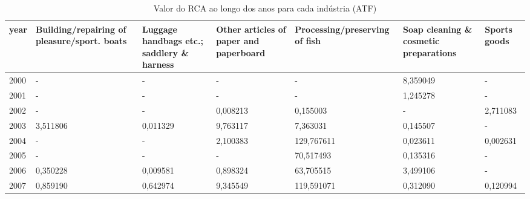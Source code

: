 \begin{table}
\centering
\caption{Valor do RCA ao longo dos anos para cada indústria (ATF)}
\begin{tabular}{p{1cm}p{2cm}p{2cm}p{2cm}p{2cm}p{2cm}p{2cm}}
\toprule
 year &  Building/repairing of pleasure/sport. boats &  Luggage handbags etc.; saddlery \& harness &  Other articles of paper and paperboard &  Processing/preserving of fish &  Soap cleaning \& cosmetic preparations &  Sports goods \\
\midrule
 2000 &                                            - &                                          - &                                       - &                              - &                               8,359049 &             - \\
 2001 &                                            - &                                          - &                                       - &                              - &                               1,245278 &             - \\
 2002 &                                            - &                                          - &                                0,008213 &                       0,155003 &                                      - &      2,711083 \\
 2003 &                                     3,511806 &                                   0,011329 &                                9,763117 &                       7,363031 &                               0,145507 &             - \\
 2004 &                                            - &                                          - &                                2,100383 &                     129,767611 &                               0,023611 &      0,002631 \\
 2005 &                                            - &                                          - &                                       - &                      70,517493 &                               0,135316 &             - \\
 2006 &                                     0,350228 &                                   0,009581 &                                0,898324 &                      63,705515 &                               3,499106 &             - \\
 2007 &                                     0,859190 &                                   0,642974 &                                9,345549 &                     119,591071 &                               0,312090 &      0,120994 \\

\end{tabular}
\end{table}
